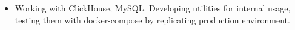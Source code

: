 \begin{itemize}
    \item Working with ClickHouse, MySQL. Developing utilities for internal usage, testing them with docker-compose by replicating production environment.
\end{itemize}
